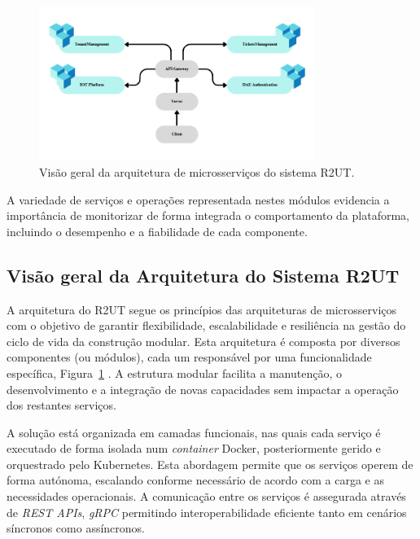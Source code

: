 \begin{figure}[H]
    \centering
    \includegraphics[width=0.8\textwidth]{images/r2ut/diagrama_new.png}
    \caption{Visão geral da arquitetura de microsserviços do sistema R2UT.}
    \label{fig:otel_arch}
\end{figure}


A variedade de serviços e operações representada nestes módulos evidencia a importância de monitorizar de forma integrada o comportamento da plataforma, incluindo o desempenho e a fiabilidade de cada componente. 

 

\clearpage


\subsection{Visão geral da Arquitetura do Sistema R2UT}

A arquitetura do R2UT segue os princípios das arquiteturas de microsserviços com o objetivo de garantir flexibilidade, escalabilidade e resiliência na gestão do ciclo de vida da construção modular. Esta arquitetura é composta por diversos componentes (ou módulos), cada um responsável por uma funcionalidade específica, Figura~\ref{fig:otel_arch} . A estrutura modular facilita a manutenção, o desenvolvimento e a integração de novas capacidades sem impactar a operação dos restantes serviços.

A solução está organizada em camadas funcionais, nas quais cada serviço é executado de forma isolada num \textit{container} Docker, posteriormente gerido e orquestrado pelo Kubernetes. Esta abordagem permite que os serviços operem de forma autónoma, escalando conforme necessário de acordo com a carga e as necessidades operacionais. A comunicação entre os serviços é assegurada através de \textit{REST APIs}, \textit{gRPC} permitindo interoperabilidade eficiente tanto em cenários síncronos como assíncronos.



